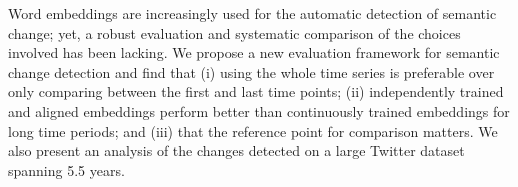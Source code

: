 Word embeddings are increasingly used for the automatic detection of semantic change; yet, a robust evaluation and systematic comparison of the choices involved has been lacking. We propose a new evaluation framework for semantic change detection and find that (i) using the whole time series is preferable over only comparing between the first and last time points; (ii) independently trained and aligned embeddings perform better than continuously trained embeddings for long time periods; and (iii) that the reference point for comparison matters.   We also present an analysis of the changes detected on a large Twitter dataset spanning 5.5 years.